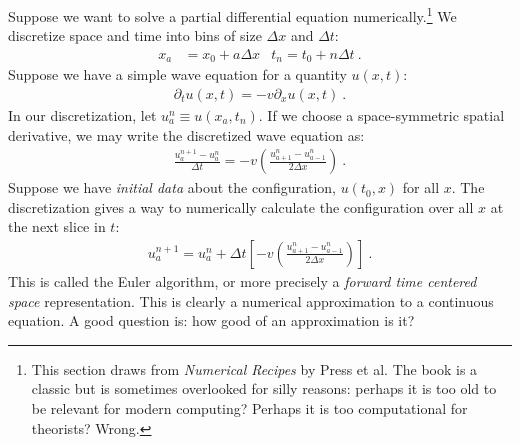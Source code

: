 \documentclass[
  11pt,
	colorful,
	raggedright,
]{tufte-style-thesis-flip}
\begin{document}
Suppose we want to solve a partial differential equation numerically.\footnote{This section draws from \emph{Numerical Recipes} by Press et al. The book is a classic but is sometimes overlooked for silly reasons: perhaps it is too old to be relevant for modern computing? Perhaps it is too computational for theorists? Wrong.} We discretize space and time into bins of size $\Delta x$ and $\Delta t$:
\begin{align}
  x_a &= x_0 + a\Delta x & t_n = t_0 + n\Delta t \ .
\end{align}
Suppose we have a simple wave equation for a quantity $u(x,t)$:
\begin{align}
  \partial_t u(x,t)= - v\partial_x u(x,t) \ .
\end{align}
In our discretization, let $u^n_a\equiv u(x_a,t_n)$.
If we choose a space-symmetric spatial derivative, we may write the discretized wave equation as:
\begin{align}
\frac{u^{n+1}_a - u^{n}_a}{\Delta t}
=
-v\left(\frac{u^n_{a+1}-u^n_{a-1}}{2\Delta x}\right) \ .
\end{align}
Suppose we have \emph{initial data} about the configuration, $u(t_0, x)$ for all $x$. The discretization gives a way to numerically calculate the configuration over all $x$ at the next slice in $t$:
\begin{align}
  u_a^{n+1} = u^n_a 
  + \Delta t
  \left[-v\left(\frac{u^n_{a+1}-u^n_{a-1}}{2\Delta x}\right)\right] \ .
  \label{eq:FTCS}
\end{align}
This is called the Euler algorithm, or more precisely a \emph{forward time centered space} representation. This is clearly a numerical approximation to a continuous equation. A good question is: how good of an approximation is it?
\end{document}
